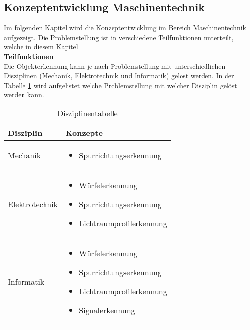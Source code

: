 \documentclass[../../main.tex]{subfiles}
\begin{document}
    \subsection{Konzeptentwicklung Maschinentechnik}
    Im folgenden Kapitel wird die Konzeptentwicklung im Bereich Maschinentechnik aufgezeigt. Die Problemstellung ist in verschiedene Teilfunktionen unterteilt, welche in diesem Kapitel\\

    \textbf{Teilfunktionen}\\
    Die Objekterkennung kann je nach Problemstellung mit unterschiedlichen Disziplinen (Mechanik,
    Elektrotechnik und Informatik) gelöst werden. In der Tabelle \ref{tab:obj_disziplin} wird
    aufgelistet welche Problemstellung mit welcher Disziplin gelöst werden kann.
    \begin{flushleft}
        \begin{table}[h]
        \begin{tabular}{ | l | p{11cm} |}
        \hline
        \textbf{Disziplin} & \textbf{Konzepte} \\ \hline
        Mechanik & \begin{itemize}
                        \item Spurrichtungserkennung
                    \end{itemize} \\ \hline
        Elektrotechnik & \begin{itemize}
                             \item Würfelerkennung
                             \item Spurrichtungserkennung
                             \item Lichtraumprofilerkennung
                         \end{itemize} \\ \hline
        Informatik &  \begin{itemize}
                        \item Würfelerkennung
                        \item Spurrichtungserkennung
                        \item Lichtraumprofilerkennung
                        \item Signalerkennung
                      \end{itemize} \\ \hline
        \end{tabular}
        \caption{Disziplinentabelle}
        \label{tab:obj_disziplin}
    \end{table}
    \end{flushleft}
\end{document}
